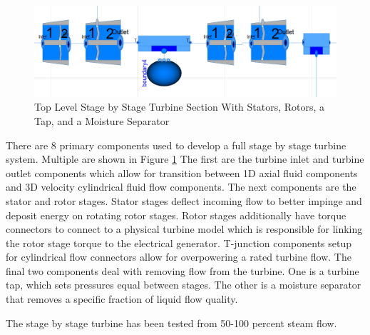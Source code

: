 \begin{figure}[hbtp]
\centering
\includegraphics[scale=0.3]{pics/StagebyStageTurbine.png}
\caption{Top Level Stage by Stage Turbine Section With Stators, Rotors, a Tap, and a Moisture Separator}
\label{Top View Stage by Stage Turbines}
\end{figure}


There are 8 primary components used to develop a full stage by stage turbine system. Multiple are shown in Figure \ref{Top View Stage by Stage Turbines} The first are the turbine inlet and turbine outlet components which allow for transition between 1D axial fluid components and 3D velocity cylindrical fluid flow components. The next components are the stator and rotor stages. Stator stages deflect incoming flow to better impinge and deposit energy on rotating rotor stages. Rotor stages additionally have torque connectors to connect to a physical turbine model which is responsible for linking the rotor stage torque to the electrical generator. T-junction components setup for cylindrical flow connectors allow for overpowering a rated turbine flow. The final two components deal with removing flow from the turbine. One is a turbine tap, which sets pressures equal between stages. The other is a moisture separator that removes a specific fraction of liquid flow quality. 

The stage by stage turbine has been tested from 50-100 percent steam flow. 




%
